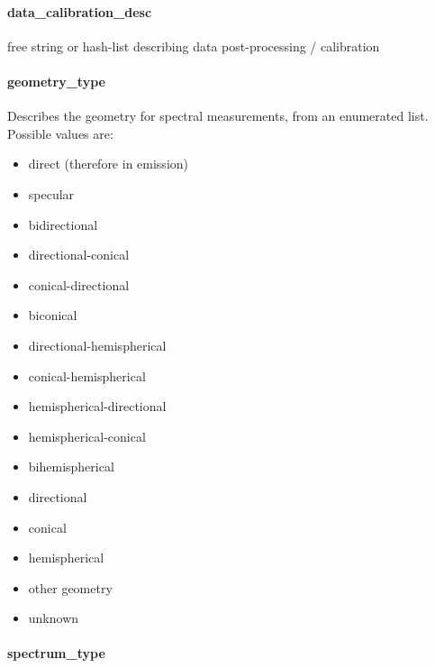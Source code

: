 \documentclass[11pt,a4paper]{ivoa}
\begin{document}
\paragraph{data\_calibration\_desc}

free string or hash-list describing data post-processing / calibration

\paragraph{geometry\_type}

Describes the geometry for spectral measurements, from an enumerated list. Possible values are:

\begin{itemize}

\item direct (therefore in emission)

\item specular

\item bidirectional

\item directional-conical

\item conical-directional

\item biconical

\item directional-hemispherical

\item conical-hemispherical

\item hemispherical-directional

\item hemispherical-conical

\item bihemispherical

\item directional

\item conical

\item hemispherical

\item other geometry

\item unknown

\end{itemize}

\paragraph{spectrum\_type}
\end{document}
